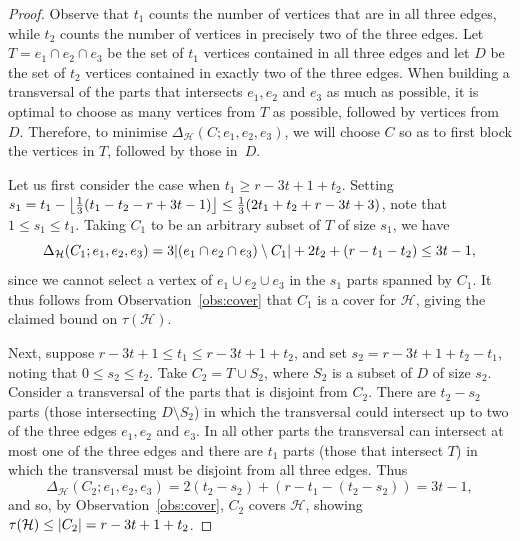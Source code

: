 \documentclass[a4paper,twoside,11pt]{article}
\DeclarePairedDelimiter{\floor}{\lfloor}{\rfloor}
\DeclarePairedDelimiter{\card}{|}{|}
\numberwithin{thm}{section}
\theoremstyle{definition}
\theoremstyle{remark}
\theoremstyle{definition}
\def\cH{{\mathcal H}}
\newcommand{\m}[1]{\mathcal{#1}}
\begin{document}
\begin{proof}
Observe that $t_1$ counts the number of vertices that are in all three edges, while $t_2$ counts the number of vertices in precisely two of the three edges.  Let $T = e_1 \cap e_2 \cap e_3$ be the set of $t_1$ vertices contained in all three edges and let $D$ be the set of $t_2$ vertices contained in exactly two of the three edges.   %
 When building a transversal of the parts that intersects $e_1, e_2$ and $e_3$ as much as possible, it is optimal to choose as many vertices from $T$ as possible, followed by vertices from $D$.  Therefore, to minimise $\Delta_{\m H}(C; e_1, e_2, e_3)$, we will choose $C$ so as to first block the vertices in $T$, followed by those in~$D$.

Let us first consider the case when $t_1\geq r-3t+1+t_2$. Setting $s_1 = t_1 - \floor*{\frac13 (t_1 - t_2 - r + 3t - 1)} \le \frac13 (2t_1 + t_2 + r - 3t + 3)$, note that $1 \le s_1 \le t_1$.  Taking $C_1$ to be an arbitrary subset of $T$ of size $s_1$, we have
\[ \Delta_{\m H}(C_1;e_1,e_2,e_3)= 3\card{(e_1\cap e_2\cap e_3)\setminus C_1} + 2t_2 +(r-t_1-t_2)\leq 3t-1, \]
since we cannot select a vertex of $e_1 \cup e_2 \cup e_3$ in the $s_1$ parts spanned by $C_1$. It thus follows from Observation~\ref{obs:cover} that $C_1$ is a cover for $\m H$, giving the claimed bound on $\tau(\m H)$.

Next, suppose $r-3t+1\leq t_1\leq r-3t+1+t_2$, and set $s_2=r-3t+1+t_2-t_1$, noting that $0\leq s_2\leq t_2$. Take $C_2=T \cup S_2$, where $S_2$ is a subset of $D$ of size $s_2$. 
Consider a transversal of the parts that is disjoint from $C_2$. There are $t_2-s_2$ parts (those intersecting $D\setminus S_2$) in which the transversal could intersect up to two of the three edges $e_1,e_2$ and $e_3$. In all other parts  the transversal can intersect at most one of the three edges and there are $t_1$ parts (those that intersect $T$) in which the transversal must be disjoint from all three edges.  %
Thus
\[\Delta_\cH(C_2;e_1,e_2,e_3)=2(t_2-s_2)+(r-t_1-(t_2-s_2))=3t-1,\]
and so, by Observation~\ref{obs:cover}, $C_2$ covers $\m H$, showing $\tau(\m H) \le \card{C_2} = r - 3t + 1 + t_2$.


\end{proof}
\end{document}
